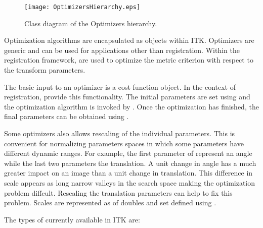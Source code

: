 


\begin{figure}
\center
\texttt{[image: OptimizersHierarchy.eps]}
\caption{Class diagram of the Optimizers hierarchy.}
\label{fig:OptimizersHierarchy}
\end{figure}

Optimization algorithms are encapsulated as  objects
within ITK. Optimizers are generic and can be used for applications other than
registration.  Within the registration framework,
 are used to optimize the metric
criterion with respect to the transform parameters.


The basic input to an optimizer is a cost function object. In the context
of registration,  provide this functionality.
The initial parameters are set using  and
the optimization algorithm is invoked by .
Once the optimization has finished, the final parameters can be obtained
using .

Some optimizers also allows rescaling of the individual parameters. This
is convenient for normalizing parameters spaces in which some parameters
have different dynamic ranges. For example, the first parameter of
 represent an angle while the last two parameters
the translation. A unit change in angle has a much greater impact on
an image than a unit change in translation. This difference in scale appears
as long narrow valleys in the search space making the optimization problem
diffcult. Rescaling the translation parameters can help to fix this problem.
Scales are represented as  of doubles and set defined using
.

The types of  currently available
in ITK are:

